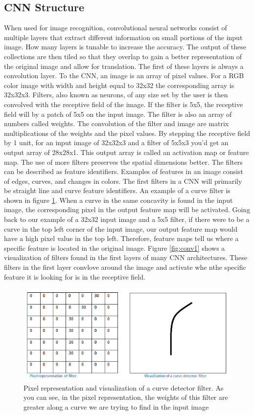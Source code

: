 \subsection{CNN Structure}
When used for image recognition, convolutional neural networks consist of multiple layers that extract different information on small portions of the input image. How many layers is tunable to increase the accuracy. The output of these collections are then tiled so that they overlap to gain a better representation of the original image and allow for translation. The first of these layers is always a convolution layer. To the CNN, an image is an array of pixel values. For a RGB color image with width and height equal to 32x32 the corresponding array is 32x32x3. Filters, also known as neurons, of any size set by the user is then convolved with the receptive field of the image. If the filter is 5x5, the receptive field will by a patch of 5x5 on the input image. The filter is also an array of numbers called weights. The convolution of the filter and image are matrix multiplications of the weights and the pixel values. By stepping the receptive field by 1 unit, for an input image of 32x32x3 and a filter of 5x5x3 you'd get an output array of 28x28x1. This output array is called an activation map or feature map. The use of more filters preserves the spatial dimensions better. The filters can be described as feature identifiers. Examples of features in an image consist of edges, curves, and changes in colors. The first filters in a CNN will primarily be straight line and curve feature identifiers. An example of a curve filter is shown in figure \ref{fig:curvedetector}. When a curve in the same concavity is found in the input image, the corresponding pixel in the output feature map will be activated. Going back to our example of a 32x32 input image and a 5x5 filter, if there were to be a curve in the top left corner of the input image, our output feature map would have a high pixel value in the top left. Therefore, feature maps tell us where a specific feature is located in the original image. Figure \ref{fig:conv1} shows a visualization of filters found in the first layers of many CNN architectures. These filters in the first layer convlove around the image and activate whe nthe specific feature it is looking for is in the receptive field. 
\begin{figure}[htp!]
\centering
\includegraphics[width=.6\textwidth]{figs/curvedetector.png}
\caption{Pixel representation and visualization of a curve detector filter. As you can see, in the pixel representation, the weights of this filter are greater along a curve we are trying to find in the input image}
\label{fig:curvedetector}
\end{figure} 

